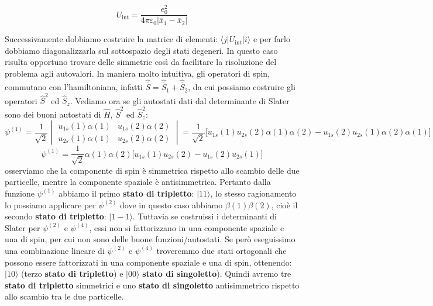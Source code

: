 \begin{equation*}
    U_{\text{int}}=\frac{e_0^2}{4\pi\varepsilon_0|\overline{x}_1-\overline{x}_2|}
\end{equation*}

Successivamente dobbiamo costruire la matrice di elementi: $\langle j|U_{\text{int}}|i\rangle$ e per farlo dobbiamo diagonalizzarla sul sottospazio degli stati degeneri. In questo caso risulta opportuno trovare delle simmetrie così da facilitare la risoluzione del problema agli autovalori. In maniera molto intuitiva, gli operatori di spin, commutano con l'hamiltoniana, infatti $\hat{\overline S} = \hat{\overline{S}}_1+\hat{\overline{S}}_2$, da cui possiamo costruire gli operatori $\hat S^2$ ed $\hat S_z$.
Vediamo ora se gli autostati dati dal determinante di Slater sono dei buoni autostati di $\hat H$, $\hat S^2$ ed $\hat S_z^2$:
\begin{equation*}
    \psi^{(1)}=\frac {1}{\sqrt 2} \begin{vmatrix} u_{1s}(1)\alpha(1) & u_{1s}(2)\alpha(2) \\ u_{2s}(1)\alpha(1) & u_{2s}(2)\alpha(2) \end{vmatrix}=\frac {1}{\sqrt 2} \big[u_{1s}(1)u_{2s}(2)\alpha(1)\alpha(2)-u_{1s}(2)u_{2s}(1)\alpha(2)\alpha(1)\big]
\end{equation*}
\begin{equation*}
    \psi^{(1)}=\frac {1}{\sqrt 2}\alpha(1)\alpha(2)\big[u_{1s}(1)u_{2s}(2)-u_{1s}(2)u_{2s}(1)\big]
\end{equation*}
osserviamo che la componente di spin è simmetrica rispetto allo scambio delle due particelle, mentre la componente spaziale è antisimmetrica.
Pertanto dalla funzione $\psi^{(1)}$ abbiamo il primo \textbf{stato di tripletto}: $|11\rangle$, lo stesso ragionamento lo possiamo applicare per $\psi^{(2)}$ dove in questo caso abbiamo $\beta(1)\beta(2)$, cioè il secondo \textbf{stato di tripletto}: $|1-1\rangle$. Tuttavia se costruissi i determinanti di Slater per $\psi^{(2)}$ e $\psi^{(4)}$, essi non si fattorizzano in una componente spaziale e una di spin, per cui non sono delle buone funzioni/autostati. Se però eseguissimo una combinazione lineare di $\psi^{(2)}$ e $\psi^{(4)}$ troveremmo due stati ortogonali che possono essere fattorizzati in una componente spaziale e una di spin, ottenendo: $|10\rangle$ (terzo \textbf{stato di tripletto}) e $|00\rangle$ \textbf{stato di singoletto}). Quindi avremo tre \textbf{stato di tripletto} simmetrici e uno \textbf{stato di singoletto} antisimmetrico rispetto allo scambio tra le due particelle.

